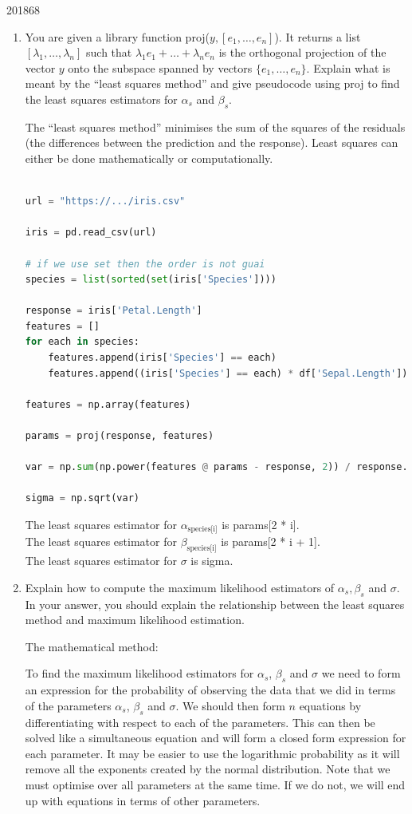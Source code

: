\documentclass[10pt,\jkfside,a4paper]{article}
\begin{document}
\begin{examquestion}{2018}{6}{8}
\begin{enumerate}[label=(\alph*)]
\item You are given a library function proj($y, [e_1, \dots, e_n]$). It
returns a list $[\lambda_1, \dots, \lambda_n]$ such that $\lambda_1 e_1 +
\dots + \lambda_n e_n$ is the orthogonal projection of the vector $y$ onto
the subspace spanned by vectors $\{e_1, \dots, e_n\}$. Explain what is meant
by the ``least squares method'' and give pseudocode using proj to find the
least squares estimators for $\alpha_s$ and $\beta_s$.

The ``least squares method'' minimises the sum of the squares of the
residuals (the differences between the prediction and the response). Least
squares can either be done mathematically or computationally.

\begin{lstlisting}[language=Python]

url = "https://.../iris.csv"

iris = pd.read_csv(url)

# if we use set then the order is not guai
species = list(sorted(set(iris['Species'])))

response = iris['Petal.Length']
features = []
for each in species:
	features.append(iris['Species'] == each)
	features.append((iris['Species'] == each) * df['Sepal.Length'])

features = np.array(features)

params = proj(response, features)

var = np.sum(np.power(features @ params - response, 2)) / response.shape[0]

sigma = np.sqrt(var)

\end{lstlisting}

The least squares estimator for $\alpha_{\text{species[i]}}$ is params[2 * i].\\
The least squares estimator for $\beta_{\text{species[i]}}$ is params[2 * i + 1].\\
The least squares estimator for $\sigma$ is sigma.

\item Explain how to compute the maximum likelihood estimators of $\alpha_s,
\beta_s$ and $\sigma$. In your answer, you should explain the relationship
between the least squares method and maximum likelihood estimation.

The mathematical method:

To find the maximum likelihood estimators for $\alpha_s$, $\beta_s$ and
$\sigma$ we need to form an expression for the probability of observing the
data that we did in terms of the parameters $\alpha_s$, $\beta_s$ and
$\sigma$. We should then form $n$ equations by differentiating with respect
to each of the parameters. This can then be solved like a simultaneous
equation and will form a closed form expression for each parameter. It may
be easier to use the logarithmic probability as it will remove all the
exponents created by the normal distribution. Note that we must optimise
over all parameters at the same time. If we do not, we will end up with
equations in terms of other parameters.


\end{enumerate}
\end{examquestion}
\end{document}
